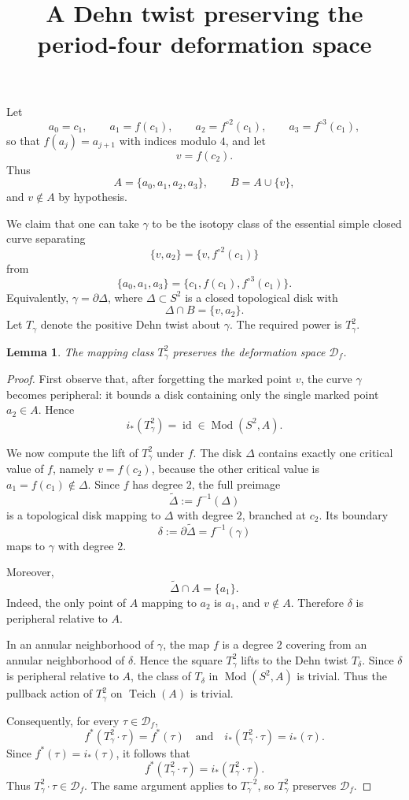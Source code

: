\documentclass[11pt]{article}
\newcommand{\Teich}{\operatorname{Teich}}
\newcommand{\Mod}{\operatorname{Mod}}
\newcommand{\D}{\mathcal D}
\newcommand{\id}{\operatorname{id}}
\newtheorem{lemma}{Lemma}
\begin{document}
\title{A Dehn twist preserving the period-four deformation space}
\author{}
\date{}
\maketitle

Let
\[
a_0=c_1,\qquad a_1=f(c_1),\qquad a_2=f^{\circ 2}(c_1),\qquad a_3=f^{\circ 3}(c_1),
\]
so that \(f(a_j)=a_{j+1}\) with indices modulo \(4\), and let
\[
v=f(c_2).
\]
Thus
\[
A=\{a_0,a_1,a_2,a_3\},\qquad B=A\cup\{v\},
\]
and \(v\notin A\) by hypothesis.

We claim that one can take \(\gamma\) to be the isotopy class of the essential simple closed curve separating
\[
\{v,a_2\}=\{v,f^{\circ 2}(c_1)\}
\]
from
\[
\{a_0,a_1,a_3\}=\{c_1,f(c_1),f^{\circ 3}(c_1)\}.
\]
Equivalently, \(\gamma=\partial \Delta\), where \(\Delta\subset S^2\) is a closed topological disk with
\[
\Delta\cap B=\{v,a_2\}.
\]
Let \(T_\gamma\) denote the positive Dehn twist about \(\gamma\). The required power is \(T_\gamma^2\).

\begin{lemma}
The mapping class \(T_\gamma^2\) preserves the deformation space \(\D_f\).
\end{lemma}

\begin{proof}
First observe that, after forgetting the marked point \(v\), the curve \(\gamma\) becomes peripheral: it bounds a disk containing only the single marked point \(a_2\in A\). Hence
\[
i_*(T_\gamma^2)=\id\in \Mod(S^2,A).
\]

We now compute the lift of \(T_\gamma^2\) under \(f\). The disk \(\Delta\) contains exactly one critical value of \(f\), namely \(v=f(c_2)\), because the other critical value is \(a_1=f(c_1)\notin\Delta\). Since \(f\) has degree \(2\), the full preimage
\[
\widetilde\Delta:=f^{-1}(\Delta)
\]
is a topological disk mapping to \(\Delta\) with degree \(2\), branched at \(c_2\). Its boundary
\[
\delta:=\partial\widetilde\Delta=f^{-1}(\gamma)
\]
maps to \(\gamma\) with degree \(2\).

Moreover,
\[
\widetilde\Delta\cap A=\{a_1\}.
\]
Indeed, the only point of \(A\) mapping to \(a_2\) is \(a_1\), and \(v\notin A\). Therefore \(\delta\) is peripheral relative to \(A\).

In an annular neighborhood of \(\gamma\), the map \(f\) is a degree \(2\) covering from an annular neighborhood of \(\delta\). Hence the square \(T_\gamma^2\) lifts to the Dehn twist \(T_\delta\). Since \(\delta\) is peripheral relative to \(A\), the class of \(T_\delta\) in \(\Mod(S^2,A)\) is trivial. Thus the pullback action of \(T_\gamma^2\) on \(\Teich(A)\) is trivial.

Consequently, for every \(\tau\in\D_f\),
\[
f^*(T_\gamma^2\cdot \tau)=f^*(\tau)
\quad\text{and}\quad
i_*(T_\gamma^2\cdot \tau)=i_*(\tau).
\]
Since \(f^*(\tau)=i_*(\tau)\), it follows that
\[
f^*(T_\gamma^2\cdot \tau)=i_*(T_\gamma^2\cdot \tau).
\]
Thus \(T_\gamma^2\cdot \tau\in\D_f\). The same argument applies to \(T_\gamma^{-2}\), so \(T_\gamma^2\) preserves \(\D_f\).
\end{proof}
\end{document}
